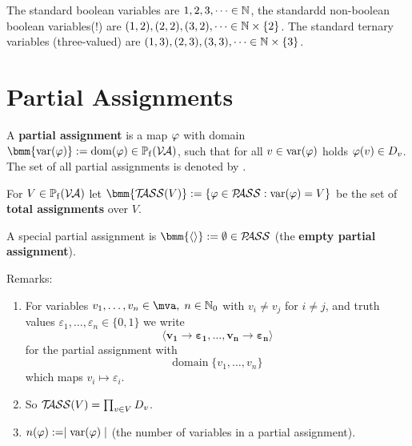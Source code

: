 \documentclass[12pt]{book}
\begin{document}
\begin{examp}\label{exp:var}
      The standard boolean variables are $1, 2, 3, \dots \in \mathbb{N}$, the standardd non-boolean boolean variables(!) are $(1,2), (2,2), (3,2), \dots \in \mathbb{N} \times \{ 2 \}$. 
	  The standard ternary variables (three-valued) are $(1,3), (2,3), (3,3), \dots \in \mathbb{N} \times \{ 3 \}$.
\end{examp}
\section{Partial Assignments}
\label{sec:Partialassignments}

\begin{defi}\label{def:Pass}
      A \textbf{partial assignment} is a map $\varphi$ with domain $\bmm{\var(\vp)} := \dom(\vp) \in \pote(\Va)$, such that for all $v \in \operatorname{var}(\varphi)$ holds $\varphi(v) \in D_v$. 
	  The set of all partial assignments is denoted by \bmm{\Pass}.

      For $V \in \operatorname{\mathbb{P}_f}(\mathcal{V\hspace{-0.1em}A})$ let $\bmm{\Tass(V)} := \set{\vp \in \Pass : \var(\vp) = V}$ be the set of \textbf{total assignments} over $V$.

      A special partial assignment is $\bmm{\epa} := \es \in \Pass$ (the \textbf{empty partial assignment}).
\end{defi}
Remarks:
\begin{enumerate}
      \item For variables $v_1, \ldots, v_n \in \mva, \; n\in \mathbb{N}_0$ with $v_i \neq v_j$ for $i\neq j$, and truth values $\varepsilon_1, \ldots, \varepsilon_n \in \{0,1\}$ we write
      \begin{displaymath}
            \pmb{\langle v_1 \to \varepsilon_1, \ldots, v_n \to \varepsilon_n\rangle}
      \end{displaymath}
      for the partial assignment with
      \begin{displaymath}
            \mbox{domain} \; \{v_1, \ldots, v_n\}
      \end{displaymath}
      which maps $v_i \mapsto \varepsilon_i$.
      \item So $\mathcal{T\hspace{-0.35em}ASS}(V) = \prod_{v \in V} D_v$.
      \item $n(\varphi) := \mid \operatorname{var}(\varphi) \mid$ (the number of variables in a partial assignment).
\end{enumerate}

\end{document}
